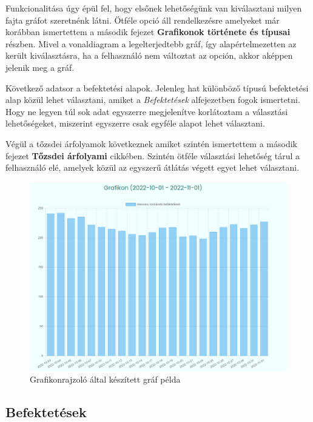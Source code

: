 	Funkcionalitása úgy épül fel, hogy elsőnek lehetőségünk van kiválasztani milyen fajta gráfot szeretnénk látni. Ötféle opció áll rendelkezésre amelyeket már korábban ismertettem a második fejezet \textbf{Grafikonok története és típusai} részben. Mivel a vonaldiagram a legelterjedtebb gráf, így alapértelmezetten az került kiválasztásra, ha a felhasználó nem változtat az opción, akkor aképpen jelenik meg a gráf. 

Következő adatsor a befektetési alapok. Jelenleg hat különböző típusú befektetési alap közül lehet választani, amiket a \emph{Befektetések} alfejezetben fogok ismertetni. Hogy ne legyen túl sok adat egyszerre megjelenítve korlátoztam a választási lehetőségeket, miszerint egyszerre csak egyféle alapot lehet választani. 

Végül a tőzsdei árfolyamok következnek amiket szintén ismertettem a második fejezet  \textbf{Tőzsdei árfolyami} cikkében. Szintén ötféle választási lehetőség tárul a felhasználó elé, amelyek közül az egyszerű átlátás végett egyet lehet választani.

\begin{figure}[h]
\centering
\includegraphics[scale=0.4]{images/graphPlotter.png}
\caption{Grafikonrajzoló által készített gráf példa}
\end{figure}

\subsection{Befektetések}

